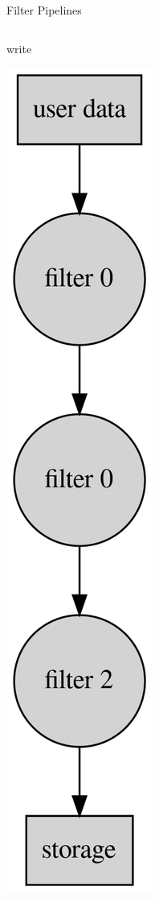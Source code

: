 \documentclass{beamer}
\begin{document}
\begin{frame}{Filter Pipelines}
  \begin{columns}
    \begin{block}{write}
      \begin{center}
        \includegraphics[height=0.75\textheight]{images/write-filter-pipeline.png}
      \end{center}
    \end{block}


\end{columns}
\end{frame}
\end{document}
